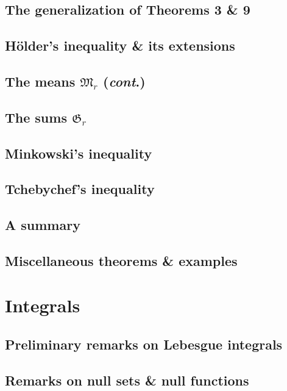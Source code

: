 \documentclass[oneside]{book}
\numberwithin{equation}{section}
\begin{document}
\subsection{The generalization of Theorems 3 \& 9}

\subsection{H\"older's inequality \& its extensions}

\subsection{The means $\mathfrak{M}_r$ (\textit{cont}.)}

\subsection{The sums $\mathfrak{G}_r$}

\subsection{Minkowski's inequality}

\subsection{Tchebychef's inequality}

\subsection{A summary}

\subsection{Miscellaneous theorems \& examples}


\section{Integrals}

\subsection{Preliminary remarks on Lebesgue integrals}

\subsection{Remarks on null sets \& null functions}
\end{document}
